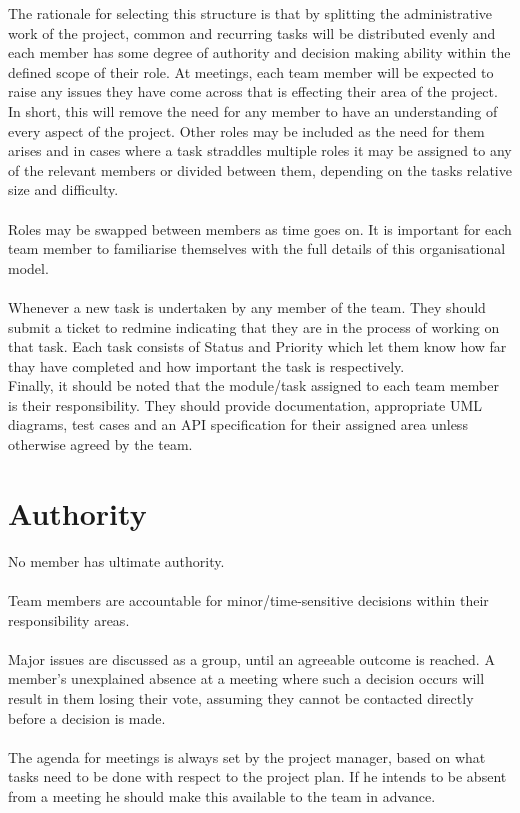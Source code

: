 \documentclass{l3deliverable}
\begin{document}
The rationale for selecting this structure is that by splitting the administrative work of the project, common and recurring tasks will be distributed evenly and each member has some degree of authority and decision making ability within the defined scope of their role. At meetings, each team member will be expected to raise any issues they have come across that is effecting their area of the project. In short, this will remove the need for any member to have an understanding of every aspect of the project.
Other roles may be included as the need for them arises and in cases where a task straddles multiple roles it may be assigned to any of the relevant members or divided between them, depending on the tasks relative size and difficulty.\\
\\
Roles may be swapped between members as time goes on. It is important for each team member to familiarise themselves with the full details of this organisational model. \\
\\
Whenever a new task is undertaken by any member of the team. They should submit a ticket to redmine indicating that they are in the process of working on that task. Each task consists of Status and Priority which let them know how far thay have completed and how important the task is respectively.
\\
Finally, it should be noted that the module/task assigned to each team member is their responsibility. They should provide documentation, appropriate UML diagrams, test cases and an API specification for their assigned area unless otherwise agreed by the team.



\section{Authority}

No member has ultimate authority. \\
\\
Team members are accountable for minor/time-sensitive decisions within their responsibility areas.\\
\\
Major issues are discussed as a group, until an agreeable outcome is reached. A member's unexplained absence at a meeting where such a decision occurs will result in them losing their vote, assuming they cannot be contacted directly before a decision is made.\\
\\
The agenda for meetings is always set by the project manager, based on what tasks need to be done with respect to the project plan. If he intends to be absent from a meeting he should make this available to the team in advance.
\end{document}
